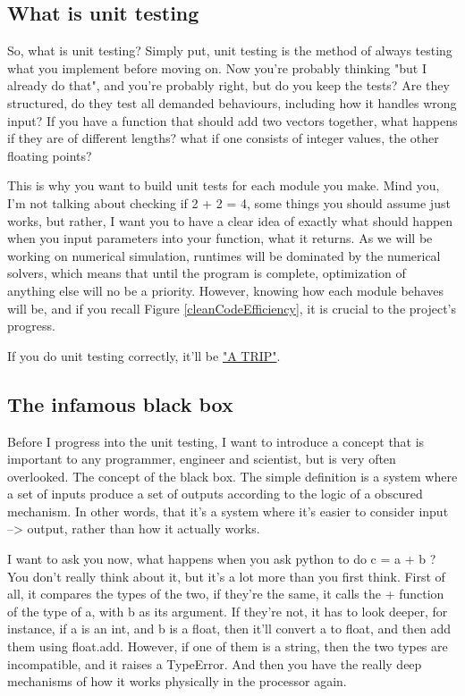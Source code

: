 \documentclass[10pt,a4paper]{article}
\begin{document}
\subsection{What is unit testing}
So, what is unit testing? Simply put, unit testing is the method of always testing what you implement before moving on. Now you're probably thinking "but I already do that", and you're probably right, but do you keep the tests? Are they structured, do they test all demanded behaviours, including how it handles wrong input? If you have a function that should add two vectors together, what happens if they are of different lengths? what if one consists of integer values, the other floating points? 

This is why you want to build unit tests for each module you make. Mind you, I'm not talking about checking if 2 + 2 = 4, some things you should assume just works, but rather, I want you to have a clear idea of exactly what should happen when you input parameters into your function, what it returns. As we will be working on numerical simulation, runtimes will be dominated by the numerical solvers, which means that until the program is complete, optimization of anything else will no be a priority. However, knowing how each module behaves will be, and if you recall Figure \ref{cleanCodeEfficiency}, it is crucial to the project's progress. 

If you do unit testing correctly, it'll be \href{http://stackoverflow.com/questions/61400/what-makes-a-good-unit-test}{"A TRIP"}.

\subsection{The infamous black box}
Before I progress into the unit testing, I want to introduce a concept that is important to any programmer, engineer and scientist, but is very often overlooked. The concept of the black box. The simple definition is a system where a set of inputs produce a set of outputs according to the logic of a obscured mechanism. In other words, that it's a system where it's easier to consider input --> output, rather than how it actually works. 

I want to ask you now, what happens when you ask python to do c = a + b ? You don't really think about it, but it's a lot more than you first think. First of all, it compares the types of the two, if they're the same, it calls the + function of the type of a, with b as its argument. If they're not, it has to look deeper, for instance, if a is an int, and b is a float, then it'll convert a to float, and then add them using float.add. However, if one of them is a string, then the two types are incompatible, and it raises a TypeError. And then you have the really deep mechanisms of how it works physically in the processor again.
\end{document}

